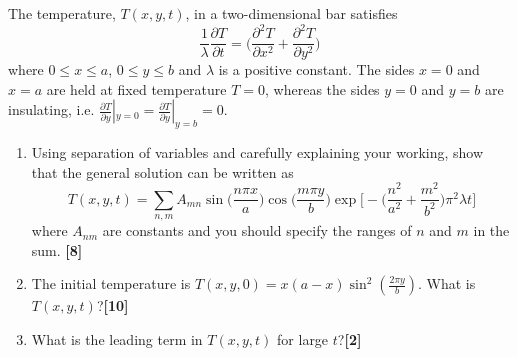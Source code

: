 \documentclass[a4paper]{article}
\begin{document}
\begin{qns}
The temperature, $T(x, y, t)$, in a two-dimensional bar satisfies
$$\frac{1}{\lambda}\frac{\partial T}{\partial t}=\bigg(\frac{\partial^2T}{\partial x^2}+\frac{\partial^2T}{\partial y^2}\bigg)$$
where $0\leq x\leq a$, $0\leq y\leq b$ and $\lambda$ is a positive constant. The sides $x = 0$ and $x = a$ are held at fixed temperature $T = 0$, whereas the sides $y = 0$ and $y = b$ are insulating, i.e. $\frac{\partial T}{\partial y}|_{y=0}=\frac{\partial T}{\partial y}|_{y=b}=0$. \begin{enumerate}[label=(\alph*)]
\item Using separation of variables and carefully explaining your working, show that the general solution can be written as
$$T(x,y,t)=\sum_{n,m}A_{mn}\sin\bigg(\frac{n\pi x}{a}\bigg)\cos\bigg(\frac{m\pi y}{b}\bigg)\exp\bigg[-\bigg(\frac{n^2}{a^2}+\frac{m^2}{b^2}\bigg)\pi^2\lambda t\bigg]$$
where $A_{nm}$ are constants and you should specify the ranges of $n$ and $m$ in the sum. \hfill\textbf{[8]}\item The initial temperature is $T(x,y,0)=x(a-x)\sin^2(\frac{2\pi y}{b})$. What is $T(x, y, t)$?\hfill\textbf{[10]}
\item What is the leading term in $T(x, y, t)$ for large $t$?\hfill\textbf{[2]}
\end{enumerate}
\end{qns}
\end{document}
